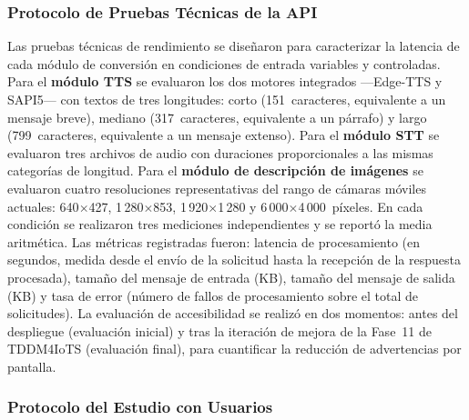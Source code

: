 \documentclass[journal]{IEEEtran}
\begin{document}
	\subsubsection{Protocolo de Pruebas T\'ecnicas de la API}
	Las pruebas t\'ecnicas de rendimiento se dise\~naron para caracterizar la latencia de cada m\'odulo de conversi\'on en condiciones de entrada variables y controladas. Para el \textbf{m\'odulo TTS} se evaluaron los dos motores integrados ---Edge-TTS y SAPI5--- con textos de tres longitudes: corto (151~caracteres, equivalente a un mensaje breve), mediano (317~caracteres, equivalente a un p\'arrafo) y largo (799~caracteres, equivalente a un mensaje extenso). Para el \textbf{m\'odulo STT} se evaluaron tres archivos de audio con duraciones proporcionales a las mismas categor\'ias de longitud. Para el \textbf{m\'odulo de descripci\'on de im\'agenes} se evaluaron cuatro resoluciones representativas del rango de c\'amaras m\'oviles actuales: 640$\times$427, 1\,280$\times$853, 1\,920$\times$1\,280 y 6\,000$\times$4\,000~p\'ixeles. En cada condici\'on se realizaron tres mediciones independientes y se report\'o la media aritm\'etica. Las m\'etricas registradas fueron: latencia de procesamiento (en segundos, medida desde el env\'io de la solicitud hasta la recepci\'on de la respuesta procesada), tama\~no del mensaje de entrada (KB), tama\~no del mensaje de salida (KB) y tasa de error (n\'umero de fallos de procesamiento sobre el total de solicitudes). La evaluaci\'on de accesibilidad se realiz\'o en dos momentos: antes del despliegue (evaluaci\'on inicial) y tras la iteraci\'on de mejora de la Fase~11 de TDDM4IoTS (evaluaci\'on final), para cuantificar la reducci\'on de advertencias por pantalla.
	
	\subsubsection{Protocolo del Estudio con Usuarios}
\end{document}
